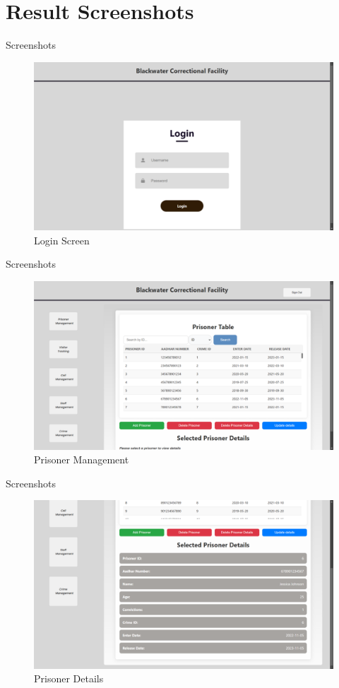 \documentclass[aspectratio=169]{beamer}
\begin{document}
\section{Result Screenshots}
\begin{frame}{Screenshots}
    \begin{figure}
        \centering
        \includegraphics[width=0.6\linewidth]{login.png}
        \caption{Login Screen}
        \label{fig:login}
    \end{figure}
\end{frame}
\begin{frame}{Screenshots}
    \begin{figure}
        \centering
        \includegraphics[width=0.6\linewidth]{prisonermgmt.png}
        \caption{Prisoner Management}
        \label{fig:pmgmt}
    \end{figure}
\end{frame}
\begin{frame}{Screenshots}
    \begin{figure}
        \centering
        \includegraphics[width=0.6\linewidth]{prisonerdet.png}
        \caption{Prisoner Details}
        \label{fig:pdet}
    \end{figure}
\end{frame}
\end{document}
